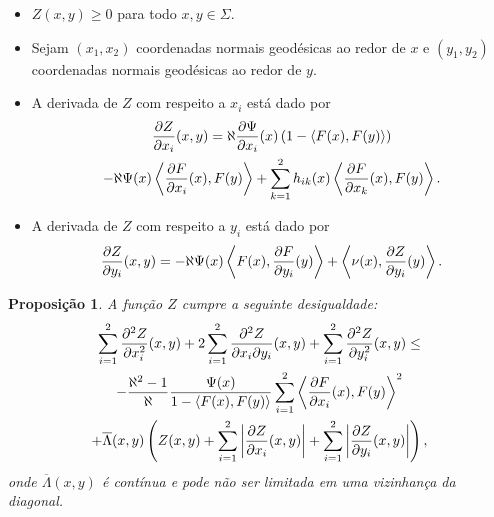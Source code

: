 \documentclass[10pt,a4paper]{beamer}
\newtheorem{proposicao}{Proposição}
\theoremstyle{definition}
\begin{document}
\begin{frame}

	\begin{itemize}
		\item $Z(x,y) \geq 0$ para todo $x,y \in \Sigma$.
		
		\pause
		
		\item Sejam $(x_1,x_2)$ coordenadas normais geodésicas ao redor de $x$ e $(y_1,y_2)$ coordenadas normais geodésicas ao redor de $y$.
		
		\pause
		
		\item A derivada de $Z$ com respeito a $x_i$ está dado por
		\begin{multline*}
		\frac{\partial Z}{\partial x_i}(x,y) = \aleph \frac{\partial \Psi}{\partial x_i}(x) \left( 1 - \left\langle F(x),F(y) \right\rangle \right) \\
		-\aleph \Psi(x) \left\langle \frac{\partial F}{\partial x_i}(x),F(y) \right\rangle + \sum_{k=1}^{2} h_{ik}(x) \left\langle \frac{\partial F}{\partial x_k}(x),F(y) \right\rangle.
		\end{multline*}
		
		\pause
		
		\item A derivada de $Z$ com respeito a $y_i$ está dado por
		\begin{equation*}
		\frac{\partial Z}{\partial y_i}(x,y) = -\aleph \Psi(x) \left\langle F(x),\frac{\partial F}{\partial y_i}(y) \right\rangle + \left\langle \nu(x),\frac{\partial Z}{\partial y_i}(y) \right\rangle.
		\end{equation*}
	\end{itemize}
	
\end{frame}
	
\begin{frame}



	\begin{proposicao}\label{sum-2nd-derivative-z-inequality}
		A função $Z$ cumpre a seguinte desigualdade:
		\begin{multline*}
			\sum_{i=1}^{2} \frac{\partial^2 Z}{\partial x_i^2}(x,y) + 2 \sum_{i=1}^{2} \frac{\partial^2 Z}{\partial x_i \partial y_i}(x,y) + \sum_{i=1}^{2} \frac{\partial^2 Z}{\partial y_i^2}(x,y) \leq \\
			- \frac{\aleph^2 -1}{\aleph} \frac{\Psi(x)}{1 - \left\langle F(x),F(y) \right\rangle} \sum_{i=1}^{2} \left\langle \frac{\partial F}{\partial x_i}(x),F(y) \right\rangle^2 \\ 
			+ \overline{\Lambda}(x,y) \left( Z(x,y) + \sum_{i=1}^{2} \left| \frac{\partial Z}{\partial x_i}(x,y) \right| + \sum_{i=1}^{2} \left| \frac{\partial Z}{\partial y_i}(x,y) \right| \right),
		\end{multline*}
		onde $\overline{\Lambda}(x,y)$ é contínua e pode não ser limitada em uma vizinhança da diagonal.
	\end{proposicao}

\end{frame}
\end{document}
